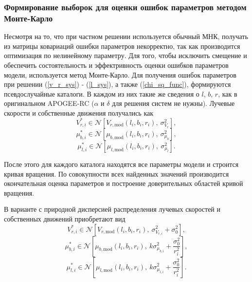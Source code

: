 \documentclass{matmex-diploma-custom}
\begin{document}
\subsubsection{Формирование выборок для оценки ошибок параметров методом \\ Монте-Карло} \label{mk}
Несмотря на то, что при частном решении используется обычный МНК, получать из матрицы ковариаций ошибки параметров некорректно, так как производится оптимизация по нелинейному параметру. Для того, чтобы исключить смещение и обеспечить состоятельность и эффектривность оценки ошибков параметров модели, используется метод Монте-Карло. Для получения ошибок параметров при решении (\ref{v_r_sys}) - (\ref{l_sys}), а также (\ref{chi_sq_func}), формируются псевдослучайные каталоги. В каждом из них такие же сведения о $l$, $b$, $r$, как в оригинальном APOGEE-RC ($\alpha$ и $\delta$ для решения систем не нужны). Лучевые скорости и собственные движения получались как
\begin{equation}
        V_{r, i}^{*} \in \mathcal{N} \left[ V_{r, \mathrm{mod}}(l_i, b_i, r_i), ~\sigma^2_{V_r} \right],
\end{equation}
\begin{equation}
        \mu_{b, i}^{*} \in \mathcal{N} \left[ \mu_{b, \mathrm{mod}}(l_i, b_i, r_i), ~\sigma^2_{\mu_b} \right],
\end{equation}
\begin{equation}
        \mu_{l, i}^{*} \in \mathcal{N} \left[ \mu_{l, \mathrm{mod}}(l_i, b_i, r_i), ~\sigma^2_{\mu_l} \right].
\end{equation}
\par После этого для каждого каталога находятся все параметры модели и строится кривая вращения. По совокупности всех найденных значений производится окончательная оценка параметров и построение доверительных областей кривой вращения.

\par В варианте с природной дисперсией распределения лучевых скоростей и собственных движений приобретают вид
\begin{equation}
        V_{r, i}^{*} \in \mathcal{N} \left[ V_{r, \mathrm{mod}}(l_i, b_i, r_i),  ~\sigma^2_{V_{r, i}} + \sigma^2_0\right],
\end{equation}
\begin{equation}
        \mu_{b, i}^{*} \in \mathcal{N} \left[ \mu_{b, \mathrm{mod}}(l_i, b_i, r_i),  ~k \sigma^2_{\mu_{b, i}} + \frac{\sigma_0^2}{r^2_i} \right],
\end{equation}
\begin{equation}
        \mu_{l, i}^{*} \in \mathcal{N} \left[ \mu_{l, \mathrm{mod}}(l_i, b_i, r_i), ~k \sigma^2_{\mu_{l, i}} + \frac{\sigma_0^2}{r^2_i} \right].
\end{equation}
\end{document}
